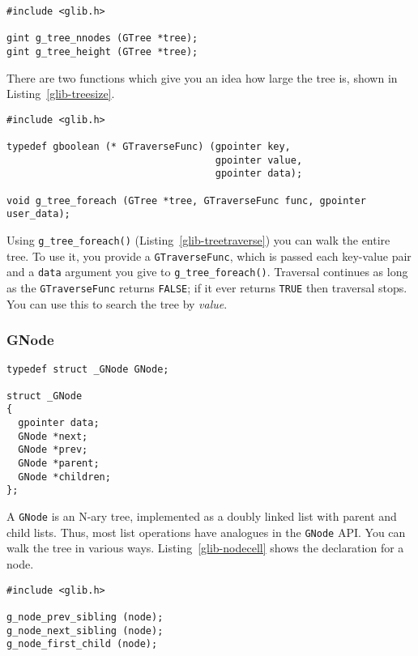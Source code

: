 \begin{lstlisting}[float, caption={Determining the size of a \lstinline{GTree}}, label=glib-treesize]
#include <glib.h>

gint g_tree_nnodes (GTree *tree);
gint g_tree_height (GTree *tree);
\end{lstlisting}

There are two functions which give you an idea how large the tree is, shown in Listing~\ref{glib-treesize}.

\begin{lstlisting}[float, caption={Traversing a \lstinline{GTree}}, label=glib-treetraverse]
#include <glib.h>

typedef gboolean (* GTraverseFunc) (gpointer key,
                                    gpointer value,
                                    gpointer data);

void g_tree_foreach (GTree *tree, GTraverseFunc func, gpointer user_data);
\end{lstlisting}

Using \lstinline{g_tree_foreach()} (Listing~\ref{glib-treetraverse}) you can walk the entire tree. To use it, you provide a \lstinline{GTraverseFunc}, which is passed each key-value pair and a \lstinline{data} argument you give to \lstinline{g_tree_foreach()}. Traversal continues as long as the \lstinline{GTraverseFunc} returns \lstinline{FALSE}; if it ever returns \lstinline{TRUE} then traversal stops. You can use this to search the tree by \emph{value}.

\subsubsection{GNode}

\begin{lstlisting}[float, caption={\lstinline{GNode} cell}, label=glib-nodecell]
typedef struct _GNode GNode;

struct _GNode
{
  gpointer data;
  GNode *next;
  GNode *prev;
  GNode *parent;
  GNode *children;
};
\end{lstlisting}

A \lstinline{GNode} is an N-ary tree, implemented as a doubly linked list with parent and child lists. Thus, most list operations have analogues in the \lstinline{GNode} API. You can walk the tree in various ways. Listing~\ref{glib-nodecell} shows the declaration for a node.

\begin{lstlisting}[float, caption={Accessing \lstinline{GNode}}, label=glib-nodeaccess]
#include <glib.h>

g_node_prev_sibling (node);
g_node_next_sibling (node);
g_node_first_child (node);
\end{lstlisting}

